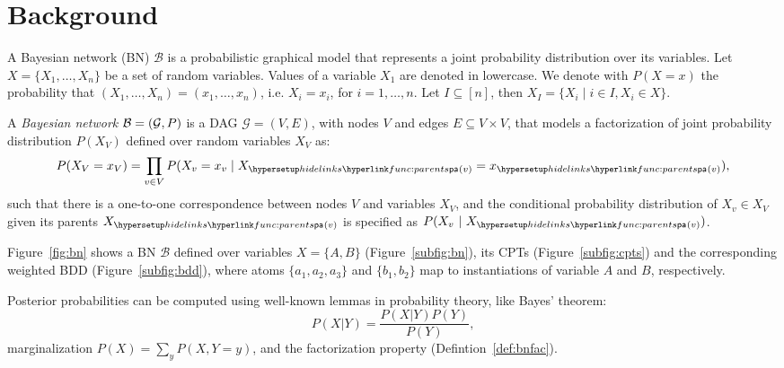 
\section{Background}
\label{sec:background}

A Bayesian network (BN) $\mathcal{B}$ is a probabilistic graphical model that represents a joint probability distribution over its variables. Let $X = \{X_1,\ldots,X_n\}$ be a set of random variables.
Values of a variable $X_1$ are denoted in lowercase.
We denote with $P(X = x)$ the probability that $(X_1,\ldots,X_n) = (x_1,\ldots,x_n)$,
i.e. $X_i = x_i$, for $i =1,\ldots,n$.
Let  $I \subseteq [n]$, then $X_I = \{X_i \mid i \in I, X_i \in X\}$. %

\begin{definition}\label{def:bnfac}
    \ULforem
    A \emph{Bayesian network} $\mathcal{B} = \left( \mathcal{G},P \right)$ is a DAG $\mathcal{G} = (V,E)$, with nodes $V$ and edges $E \subseteq V \times V$, that models a factorization of joint probability distribution $P(X_V)$ defined over random variables $X_V$ as:%
    \begin{equation}
    P(X_V = x_V) = \prod_{v \in V}P(X_v = x_v \mid X_{\myparents(v)}= x_{\myparents(v)}),
    \end{equation}%
    \noindent such that there is a one-to-one correspondence between nodes $V$ and variables $X_V$, and the conditional probability distribution of $X_v \in X_V$ given its parents $X_{\myparents(v)}$ is specified as $P(X_v\ |\ X_{\myparents(v)})$.

\end{definition}

\begin{example}\label{ex:full}\label{ex:bn}
 Figure~\ref{fig:bn} shows a BN $\mathcal{B}$ defined over variables $X = \{A,B\}$ (Figure~\ref{subfig:bn}), its CPTs (Figure~\ref{subfig:cpts}) and the corresponding weighted BDD (Figure~\ref{subfig:bdd}), where atoms $\{a_1,a_2,a_3\}$ and $\{b_1,b_2\}$ map to instantiations of variable $A$ and $B$, respectively.
 \vspace{-2em}

\end{example}

Posterior probabilities can be computed using well-known lemmas in probability theory, like Bayes’ theorem:
\[P(X | Y) = \frac{P(X | Y)P(Y)}{P(Y)},\]
marginalization $P(X) = \sum_{y} P(X, Y = y)$, and the factorization property (Defintion~\ref{def:bnfac}).


